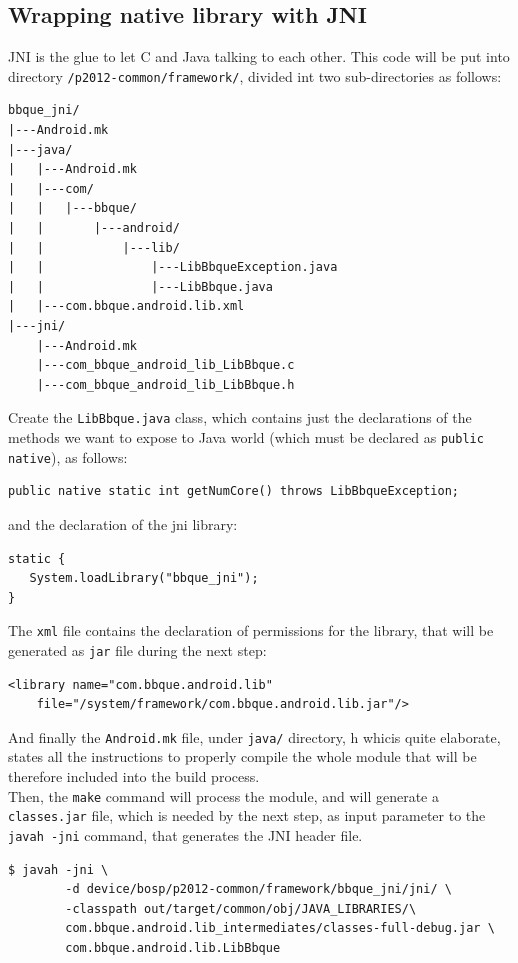 \subsection{Wrapping native library with JNI}
\label{JNIwrapping}
JNI is the glue to let C and Java talking to each other. This code will be put into directory \texttt{/p2012-common/framework/}, divided int two sub-directories as follows:
\begin{verbatim}
bbque_jni/
|---Android.mk
|---java/
|   |---Android.mk
|   |---com/
|   |   |---bbque/
|   |       |---android/
|   |           |---lib/
|   |               |---LibBbqueException.java
|   |               |---LibBbque.java
|   |---com.bbque.android.lib.xml
|---jni/
    |---Android.mk
    |---com_bbque_android_lib_LibBbque.c
    |---com_bbque_android_lib_LibBbque.h
\end{verbatim}
Create the \texttt{LibBbque.java} class, which contains just the declarations of the methods we want to expose to Java world (which must be declared as \texttt{public native}), as follows:
\begin{verbatim}
public native static int getNumCore() throws LibBbqueException;
\end{verbatim}
and the declaration of the jni library:
\begin{verbatim}
static {
   System.loadLibrary("bbque_jni");
}
\end{verbatim}
The \texttt{xml} file contains the declaration of permissions for the library, that will be generated as \texttt{jar} file during the next step:
\begin{verbatim}
<library name="com.bbque.android.lib"
    file="/system/framework/com.bbque.android.lib.jar"/>
\end{verbatim}
And finally the \texttt{Android.mk} file, under \texttt{java/} directory, h whicis quite elaborate, states all the instructions to properly compile the whole module that will be therefore included into the build process.\\
Then, the \texttt{make} command will process the module, and will generate a \texttt{classes.jar} file, which is needed by the next step, as input parameter to the \texttt{javah -jni} command, that generates the JNI header file.
\begin{verbatim}
$ javah -jni \
        -d device/bosp/p2012-common/framework/bbque_jni/jni/ \
        -classpath out/target/common/obj/JAVA_LIBRARIES/\ 
        com.bbque.android.lib_intermediates/classes-full-debug.jar \
        com.bbque.android.lib.LibBbque
\end{verbatim}
